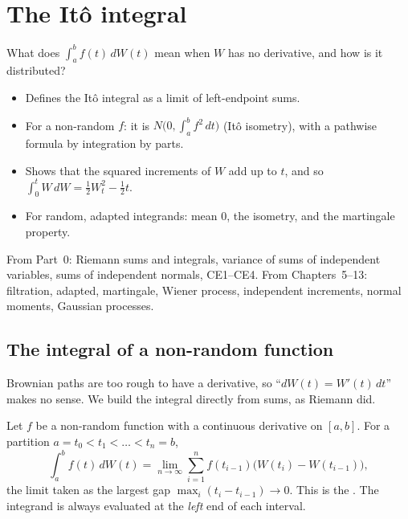 \chapter{The Itô integral}
\label{ch:ito-integral}

\begin{question}
What does $\int_a^b f(t)\,dW(t)$ mean when $W$ has no derivative, and how is it distributed?
\end{question}

\begin{whatfor}
\begin{itemize}
  \item Defines the Itô integral as a limit of left-endpoint sums.
  \item For a non-random $f$: it is $N\big(0,\int_a^bf^2\,dt\big)$ (Itô isometry), with a pathwise formula by integration by parts.
  \item Shows that the squared increments of $W$ add up to $t$, and so $\int_0^tW\,dW=\frac12W_t^2-\frac12t$.
  \item For random, adapted integrands: mean $0$, the isometry, and the martingale property.
\end{itemize}
\end{whatfor}

\begin{prereq}
From Part~0: Riemann sums and integrals, variance of sums of independent variables, sums of independent normals, CE1--CE4. From Chapters~5--13: filtration, adapted, martingale, Wiener process, independent increments, normal moments, Gaussian processes.
\end{prereq}

\section{The integral of a non-random function}

Brownian paths are too rough to have a derivative, so ``$dW(t)=W'(t)\,dt$'' makes no sense. We build the integral directly from sums, as Riemann did.

\begin{definition}
\label{def:ito-det}
Let $f$ be a non-random function with a continuous derivative on $[a,b]$. For a partition $a=t_0<t_1<\dots<t_n=b$,
\[
  \int_a^bf(t)\,dW(t)=\lim_{n\to\infty}\sum_{i=1}^nf(t_{i-1})\big(W(t_i)-W(t_{i-1})\big),
\]
the limit taken as the largest gap $\max_i(t_i-t_{i-1})\to0$. This is the . The integrand is always evaluated at the \emph{left} end of each interval.
\end{definition}

